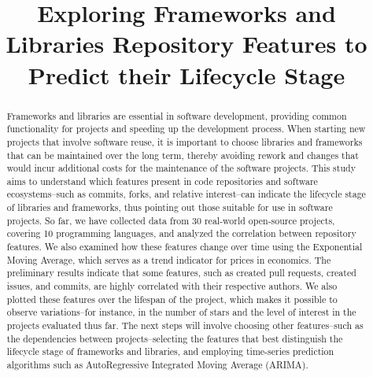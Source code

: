 \documentclass[10pt,conference,peerreview]{IEEEtran}
\begin{document}
\title{Exploring Frameworks and Libraries Repository Features to Predict their Lifecycle Stage}

\author{
    \and
}

\IEEEpeerreviewmaketitle %

\begin{abstract}
    Frameworks and libraries are essential in software development, providing common functionality for projects and speeding up the development process.
    When starting new projects that involve software reuse, it is important to choose libraries and frameworks that can be maintained over the long term, thereby avoiding rework and changes that would incur additional costs for the maintenance of the software projects.
    This study aims to understand which features present in code repositories and software ecosystems--such as commits, forks, and relative interest--can indicate the lifecycle stage of libraries and frameworks, thus pointing out those suitable for use in software projects.
    So far, we have collected data from 30 real-world open-source projects, covering 10 programming languages, and analyzed the correlation between repository features. We also examined how these features change over time using the Exponential Moving Average, which serves as a trend indicator for prices in economics.
    The preliminary results indicate that some features, such as created pull requests, created issues, and commits, are highly correlated with their respective authors. We also plotted these features over the lifespan of the project, which makes it possible to observe variations--for instance, in the number of stars and the level of interest in the projects evaluated thus far.
    The next steps will involve choosing other features--such as the dependencies between projects--selecting the features that best distinguish the lifecycle stage of frameworks and libraries, and employing time-series prediction algorithms such as AutoRegressive Integrated Moving Average (ARIMA).
\end{abstract}
\end{document}
